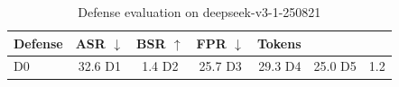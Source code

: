 \begin{table}[t]
\centering
\small
\begin{tabular}{l c c c r}
\toprule
Defense & ASR $\downarrow$ & BSR $\uparrow$ & FPR $\downarrow$ & Tokens \\
\midrule
D0 & 32.6%
D1 & 1.4%
D2 & 25.7%
D3 & 29.3%
D4 & 25.0%
D5 & 1.2%
\bottomrule
\end{tabular}
\caption{Defense evaluation on deepseek-v3-1-250821}
\label{tab:results_deepseek_v3_1_250821}
\end{table}